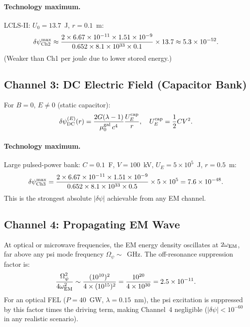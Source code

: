 \documentclass[11pt,twocolumn]{article}
\newcommand{\dpsi}{\delta\psi}
\newcommand{\lam}{\lambda}
\newcommand{\Opsi}{\Omega_\psi}
\begin{document}
\paragraph{Technology maximum.} LCLS-II: $U_0 = 13.7$~J, $r = 0.1$~m:
\begin{equation}
\dpsi_{\rm Ch2}^{\rm max} \approx
\frac{2\times6.67\times10^{-11}\times1.51\times10^{-9}}
{0.652\times8.1\times10^{33}\times0.1}\times13.7
\approx 5.3\times10^{-52}.
\end{equation}
(Weaker than Ch1 per joule due to lower stored energy.)

\subsection{Channel 3: DC Electric Field (Capacitor Bank)}

For $B = 0$, $E \neq 0$ (static capacitor):
\begin{equation}
\dpsi_{\rm DC}^{(E)}(r) = \frac{2G(\lam-1)}{\mu_0^{\rm gal}\,c^4}
\frac{U_E^{\rm cap}}{r},
\quad U_E^{\rm cap} = \frac{1}{2}CV^2.
\label{eq:ch3_cap}
\end{equation}

\paragraph{Technology maximum.} Large pulsed-power bank: $C = 0.1$~F,
$V = 100$~kV, $U_E = 5\times10^5$~J, $r = 0.5$~m:
\begin{equation}
\dpsi_{\rm Ch3}^{\rm max} =
\frac{2\times6.67\times10^{-11}\times1.51\times10^{-9}}
{0.652\times8.1\times10^{33}\times0.5}\times5\times10^5
= 7.6\times10^{-48}.
\end{equation}
This is the strongest absolute $|\dpsi|$ achievable from any EM channel.

\subsection{Channel 4: Propagating EM Wave}

At optical or microwave frequencies, the EM energy density oscillates
at $2\omega_{\rm EM}$, far above any psi mode frequency $\Opsi \sim$~GHz.
The off-resonance suppression factor is:
\begin{equation}
\frac{\Opsi^2}{4\omega_{\rm EM}^2}
\sim \frac{(10^{10})^2}{4\times(10^{15})^2} = \frac{10^{20}}{4\times10^{30}}
= 2.5\times10^{-11}.
\end{equation}
For an optical FEL ($P = 40$~GW, $\lambda = 0.15$~nm), the psi
excitation is suppressed by this factor times the driving term, making
Channel~4 negligible ($|\dpsi| < 10^{-60}$ in any realistic scenario).
\end{document}

